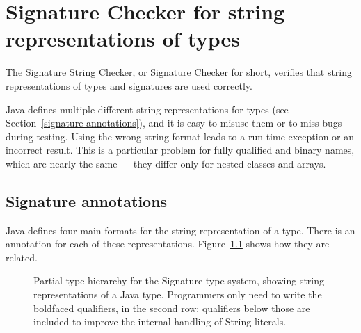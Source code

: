 \htmlhr
\chapter{Signature Checker for string representations of types\label{signature-checker}}

The Signature String Checker, or Signature Checker for short, verifies that
string representations of types and signatures are used correctly.

Java defines multiple different string representations for types (see
Section~\ref{signature-annotations}), and it is easy to
misuse them or to miss bugs during testing.  Using the wrong string format
leads to a run-time exception or an incorrect result.  This is a particular
problem for fully qualified and binary names, which are nearly the same ---
they differ only for nested classes and arrays.


\section{Signature annotations\label{signature-annotations}}

Java defines four main formats for the string representation of a type.
There is an annotation for each of these representations.
Figure~\ref{fig-signature-hierarchy} shows how they are related.

\begin{figure}
\caption{Partial type hierarchy for the Signature type system, showing
  string representations of a Java type.  Programmers only need to write
  the boldfaced qualifiers, in the second row; qualifiers below those are
  included to improve the internal handling of String literals.}
\label{fig-signature-hierarchy}
\end{figure}

